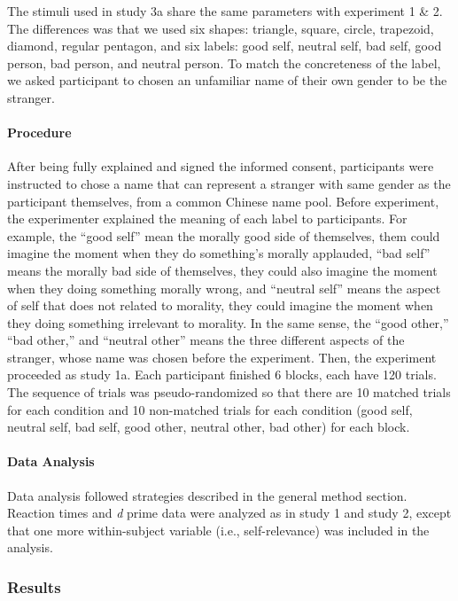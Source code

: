 \documentclass[
  english,
  man]{apa6}
\let\oldparagraph\paragraph
\renewcommand{\paragraph}[1]{\oldparagraph{#1}\mbox{}}
\begin{document}
The stimuli used in study 3a share the same parameters with experiment 1 \& 2. The differences was that we used six shapes: triangle, square, circle, trapezoid, diamond, regular pentagon, and six labels: good self, neutral self, bad self, good person, bad person, and neutral person. To match the concreteness of the label, we asked participant to chosen an unfamiliar name of their own gender to be the stranger.

\hypertarget{procedure-5}{%
\paragraph{Procedure}\label{procedure-5}}

After being fully explained and signed the informed consent, participants were instructed to chose a name that can represent a stranger with same gender as the participant themselves, from a common Chinese name pool. Before experiment, the experimenter explained the meaning of each label to participants. For example, the ``good self'' mean the morally good side of themselves, them could imagine the moment when they do something's morally applauded, ``bad self'' means the morally bad side of themselves, they could also imagine the moment when they doing something morally wrong, and ``neutral self'' means the aspect of self that does not related to morality, they could imagine the moment when they doing something irrelevant to morality. In the same sense, the ``good other,'' ``bad other,'' and ``neutral other'' means the three different aspects of the stranger, whose name was chosen before the experiment. Then, the experiment proceeded as study 1a. Each participant finished 6 blocks, each have 120 trials. The sequence of trials was pseudo-randomized so that there are 10 matched trials for each condition and 10 non-matched trials for each condition (good self, neutral self, bad self, good other, neutral other, bad other) for each block.

\hypertarget{data-analysis-6}{%
\paragraph{Data Analysis}\label{data-analysis-6}}

Data analysis followed strategies described in the general method section. Reaction times and \emph{d} prime data were analyzed as in study 1 and study 2, except that one more within-subject variable (i.e., self-relevance) was included in the analysis.

\hypertarget{results-5}{%
\subsubsection{Results}\label{results-5}}
\end{document}
